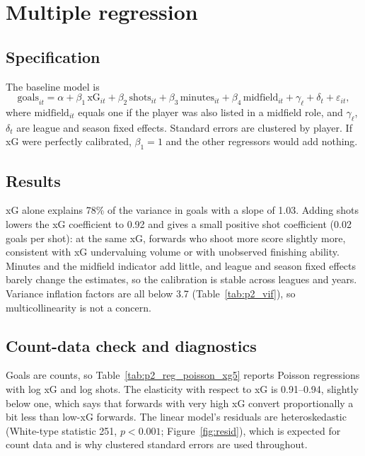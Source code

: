 \documentclass[11pt,a4paper]{article}
\begin{document}
\section{Multiple regression}

\subsection{Specification}

The baseline model is
\begin{equation}
\text{goals}_{it} = \alpha + \beta_1\,\text{xG}_{it} + \beta_2\,\text{shots}_{it} + \beta_3\,\text{minutes}_{it} + \beta_4\,\text{midfield}_{it} + \gamma_{\ell} + \delta_t + \varepsilon_{it},
\end{equation}
where $\text{midfield}_{it}$ equals one if the player was also listed in a midfield role, and $\gamma_\ell$, $\delta_t$ are league and season fixed effects. Standard errors are clustered by player. If xG were perfectly calibrated, $\beta_1=1$ and the other regressors would add nothing.

\subsection{Results}



xG alone explains 78\% of the variance in goals with a slope of 1.03. Adding shots lowers the xG coefficient to 0.92 and gives a small positive shot coefficient (0.02 goals per shot): at the same xG, forwards who shoot more score slightly more, consistent with xG undervaluing volume or with unobserved finishing ability. Minutes and the midfield indicator add little, and league and season fixed effects barely change the estimates, so the calibration is stable across leagues and years. Variance inflation factors are all below 3.7 (Table~\ref{tab:p2_vif}), so multicollinearity is not a concern.



\subsection{Count-data check and diagnostics}

Goals are counts, so Table~\ref{tab:p2_reg_poisson_xg5} reports Poisson regressions with log xG and log shots. The elasticity with respect to xG is 0.91--0.94, slightly below one, which says that forwards with very high xG convert proportionally a bit less than low-xG forwards. The linear model's residuals are heteroskedastic (White-type statistic 251, $p<0.001$; Figure~\ref{fig:resid}), which is expected for count data and is why clustered standard errors are used throughout.
\end{document}
